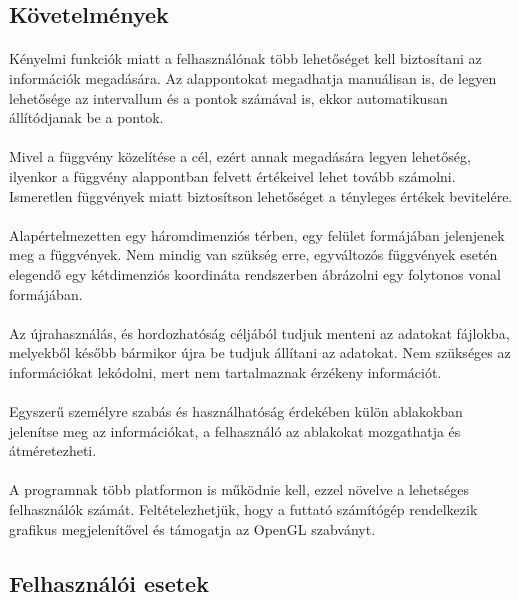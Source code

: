 \documentclass[12pt]{report}
\begin{document}
\subsection{Követelmények}
\paragraph{}
Kényelmi funkciók miatt a felhasználónak több lehetőséget kell biztosítani az információk megadására. Az alappontokat megadhatja manuálisan is, de legyen lehetősége az intervallum és a pontok számával is, ekkor automatikusan állítódjanak be a pontok.
\paragraph{}
Mivel a függvény közelítése a cél, ezért annak megadására legyen lehetőség, ilyenkor a függvény alappontban felvett értékeivel lehet tovább számolni. Ismeretlen függvények miatt biztosítson lehetőséget a tényleges értékek bevitelére.
\paragraph{}
Alapértelmezetten egy háromdimenziós térben, egy felület formájában jelenjenek meg a függvények. Nem mindig van szükség erre, egyváltozós függvények esetén elegendő egy kétdimenziós koordináta rendszerben ábrázolni egy folytonos vonal formájában.
\paragraph{}
Az újrahasználás, és hordozhatóság céljából tudjuk menteni az adatokat fájlokba, melyekből később bármikor újra be tudjuk állítani az adatokat. Nem szükséges az információkat lekódolni, mert nem tartalmaznak érzékeny információt.
\paragraph{}
Egyszerű személyre szabás és használhatóság érdekében külön ablakokban jelenítse meg az információkat, a felhasználó az ablakokat mozgathatja és átméretezheti.
\paragraph{}
A programnak több platformon is működnie kell, ezzel növelve a lehetséges felhasználók számát. Feltételezhetjük, hogy a futtató számítógép rendelkezik grafikus megjelenítővel és támogatja az OpenGL szabványt.

\subsection{Felhasználói esetek}
\end{document}
